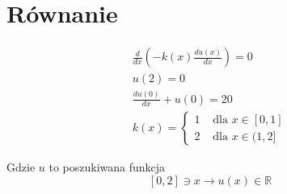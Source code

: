 \documentclass{article}
\begin{document}
\section{Równanie}
$$
\begin{gathered}
    \frac{d}{d x}(-k(x) \frac{d u(x)}{d x})=0 \\
    u(2)=0 \\
    \frac{d u(0)}{d x}+u(0)=20 \\
k(x)= \begin{cases}1 & \text { dla } x \in[0,1] \\
    2 & \text { dla } x \in(1,2]\end{cases}
\end{gathered}
$$

Gdzie $u$ to poszukiwana funkcja
$$
[0,2] \ni x \rightarrow u(x) \in \mathbb{R}
$$
\end{document}
